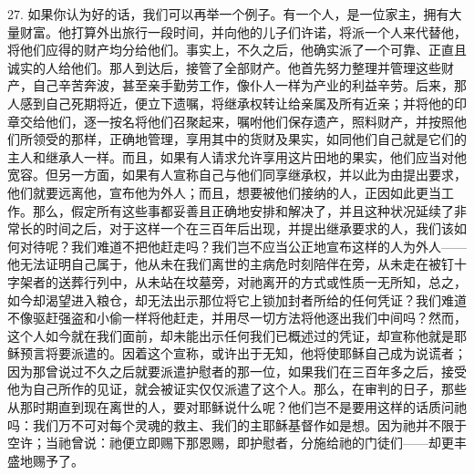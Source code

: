27. 如果你认为好的话，我们可以再举一个例子。有一个人，是一位家主，拥有大量财富。他打算外出旅行一段时间，并向他的儿子们许诺，将派一个人来代替他，将他们应得的财产均分给他们。事实上，不久之后，他确实派了一个可靠、正直且诚实的人给他们。那人到达后，接管了全部财产。他首先努力整理并管理这些财产，自己辛苦奔波，甚至亲手勤劳工作，像仆人一样为产业的利益辛劳。后来，那人感到自己死期将近，便立下遗嘱，将继承权转让给亲属及所有近亲；并将他的印章交给他们，逐一按名将他们召聚起来，嘱咐他们保存遗产，照料财产，并按照他们所领受的那样，正确地管理，享用其中的货财及果实，如同他们自己就是它们的主人和继承人一样。而且，如果有人请求允许享用这片田地的果实，他们应当对他宽容。但另一方面，如果有人宣称自己与他们同享继承权，并以此为由提出要求，他们就要远离他，宣布他为外人；而且，想要被他们接纳的人，正因如此更当工作。那么，假定所有这些事都妥善且正确地安排和解决了，并且这种状况延续了非常长的时间之后，对于这样一个在三百年后出现，并提出继承要求的人，我们该如何对待呢？我们难道不把他赶走吗？我们岂不应当公正地宣布这样的人为外人——他无法证明自己属于，他从未在我们离世的主病危时刻陪伴在旁，从未走在被钉十字架者的送葬行列中，从未站在坟墓旁，对祂离开的方式或性质一无所知，总之，如今却渴望进入粮仓，却无法出示那位将它上锁加封者所给的任何凭证？我们难道不像驱赶强盗和小偷一样将他赶走，并用尽一切方法将他逐出我们中间吗？然而，这个人如今就在我们面前，却未能出示任何我们已概述过的凭证，却宣称他就是耶稣预言将要派遣的。因着这个宣称，或许出于无知，他将使耶稣自己成为说谎者；因为那曾说过不久之后就要派遣护慰者的那一位，如果我们在三百年多之后，接受他为自己所作的见证，就会被证实仅仅派遣了这个人。那么，在审判的日子，那些从那时期直到现在离世的人，要对耶稣说什么呢？他们岂不是要用这样的话质问祂吗：我们万不可对每个灵魂的救主、我们的主耶稣基督作如是想。因为祂并不限于空许；当祂曾说：祂便立即赐下那恩赐，即护慰者，分施给祂的门徒们——却更丰盛地赐予了。\par

